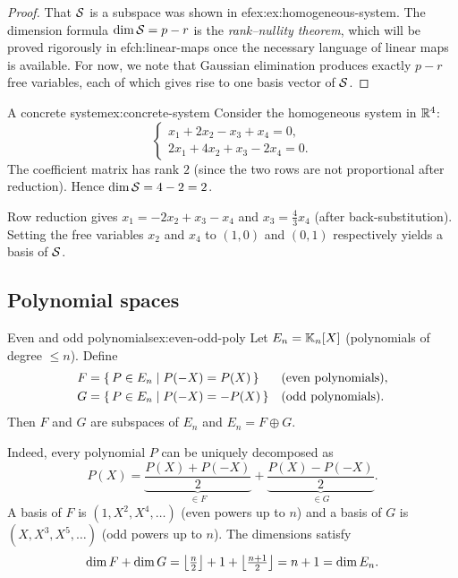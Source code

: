 \begin{proof}
That ${\mathcal{S}}$ is a subspace was shown in 
ef{ex:ex:homogeneous-system}. The
dimension formula $\dim{\mathcal{S}} = p - r$ is the \emph{rank--nullity theorem},
which will be proved rigorously in 
ef{ch:linear-maps} once the
necessary language of linear maps is available. For now, we note that
Gaussian elimination produces exactly $p - r$ free variables, each of
which gives rise to one basis vector of ${\mathcal{S}}$.
\end{proof}

\begin{example}{A concrete system}{ex:concrete-system}
Consider the homogeneous system in ${\mathbb{R}}^4$:
\[
  \begin{cases}
    x_1 + 2x_2 - x_3 + x_4 = 0, \\
    2x_1 + 4x_2 + x_3 - 2x_4 = 0.
  \end{cases}
\]
The coefficient matrix has rank $2$ (since the two rows are not
proportional after reduction). Hence $\dim{\mathcal{S}} = 4-2 = 2$.

Row reduction gives $x_1 = -2x_2 + x_3 - x_4$ and $x_3 = \frac{4}{3}x_4$
(after back-substitution). Setting the free variables $x_2$ and $x_4$ to
$(1,0)$ and $(0,1)$ respectively yields a basis of ${\mathcal{S}}$.
\end{example}

\subsection{Polynomial spaces}\label{subsec:polynomial-applications}

\begin{example}{Even and odd polynomials}{ex:even-odd-poly}
Let $E_n = {\mathbb{K}}_n[X]$ (polynomials of degree $\leq n$). Define
\begin{align*}
  F &= \left\{\,P\in E_n\;\middle|\;P(-X)=P(X)\,\right\} &&\text{(even polynomials)}, \\
  G &= \left\{\,P\in E_n\;\middle|\;P(-X)=-P(X)\,\right\} &&\text{(odd polynomials)}.
\end{align*}
Then $F$ and $G$ are subspaces of $E_n$ and $E_n = F\oplus G$.

Indeed, every polynomial $P$ can be uniquely decomposed as
\[
  P(X) = \underbrace{\frac{P(X)+P(-X)}{2}}_{\in F}
        + \underbrace{\frac{P(X)-P(-X)}{2}}_{\in G}.
\]
A basis of $F$ is $(1,X^2,X^4,\ldots)$ (even powers up to $n$) and a
basis of $G$ is $(X,X^3,X^5,\ldots)$ (odd powers up to $n$). The
dimensions satisfy
\[
  \dim F + \dim G = \left\lfloor\tfrac{n}{2}\right\rfloor+1
  + \left\lfloor\tfrac{n+1}{2}\right\rfloor = n+1 = \dim E_n. \qedhere
\]
\end{example}

